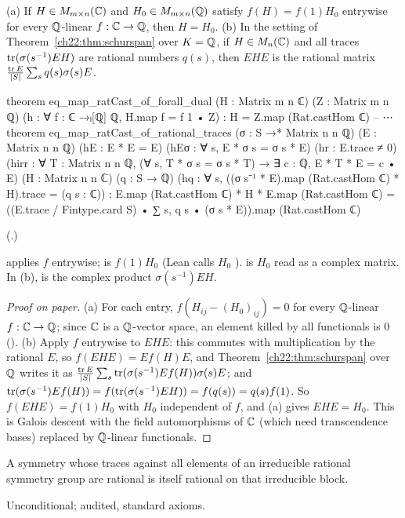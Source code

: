\begin{theorem}\label{ch22:thm:descent}
(a) If $H\in M_{m\times n}({\mathbb{C}})$ and $H_0\in M_{m\times n}({\mathbb{Q}})$ satisfy $f(H)=f(1)H_0$ entrywise for every ${\mathbb{Q}}$-linear
$f:{\mathbb{C}}\to{\mathbb{Q}}$, then $H=H_0$.
(b) In the setting of Theorem~\ref{ch22:thm:schurspan} over $K={\mathbb{Q}}$, if $H\in M_n({\mathbb{C}})$ and all traces
$\operatorname{tr}(\sigma(s^{-1})EH)$ are rational numbers $q(s)$, then $EHE$ is the rational matrix
$\frac{\operatorname{tr} E}{|S|}\sum_sq(s)\sigma(s)E$.
\end{theorem}
\begin{leancode}
theorem eq_map_ratCast_of_forall_dual (H : Matrix m n ℂ) (Z : Matrix m n ℚ)
    (h : ∀ f : ℂ →ₗ[ℚ] ℚ, H.map f = f 1 • Z) : H = Z.map (Rat.castHom ℂ)
-- ⋯
theorem eq_map_ratCast_of_rational_traces (σ : S →* Matrix n n ℚ) (E : Matrix n n ℚ)
    (hE : E * E = E) (hEσ : ∀ s, E * σ s = σ s * E) (hr : E.trace ≠ 0)
    (hirr : ∀ T : Matrix n n ℚ, (∀ s, T * σ s = σ s * T) → ∃ c : ℚ, E * T * E = c • E)
    (H : Matrix n n ℂ) (q : S → ℚ)
    (hq : ∀ s, ((σ s⁻¹ * E).map (Rat.castHom ℂ) * H).trace = (q s : ℂ)) :
    E.map (Rat.castHom ℂ) * H * E.map (Rat.castHom ℂ)
      = ((E.trace / Fintype.card S) • ∑ s, q s • (σ s * E)).map (Rat.castHom ℂ)
\end{leancode}
(.)
\begin{dictionary}
 applies $f$ entrywise;  is $f(1)H_0$ (Lean calls $H_0$ ).   is $H_0$ read as a complex
matrix.  In (b),  is the complex product $\sigma(s^{-1})EH$.
\end{dictionary}
\begin{proof}[Proof on paper]
(a) For each entry, $f(H_{ij}-(H_0)_{ij})=0$ for every ${\mathbb{Q}}$-linear $f:{\mathbb{C}}\to{\mathbb{Q}}$; since ${\mathbb{C}}$ is a ${\mathbb{Q}}$-vector space, an element
killed by all functionals is $0$ ().  (b) Apply $f$ entrywise to $EHE$: this
commutes with multiplication by the rational $E$, so $f(EHE)=Ef(H)E$, and Theorem~\ref{ch22:thm:schurspan} over ${\mathbb{Q}}$
writes it as $\frac{\operatorname{tr} E}{|S|}\sum_s\operatorname{tr}(\sigma(s^{-1})Ef(H))\sigma(s)E$; and $\operatorname{tr}(\sigma(s^{-1})Ef(H))=f(\operatorname{tr}(\sigma(s^{-1})EH))=
f(q(s))=q(s)f(1)$.  So $f(EHE)=f(1)H_0$ with $H_0$ independent of $f$, and (a) gives $EHE=H_0$.  This is Galois descent with the
field automorphisms of ${\mathbb{C}}$ (which need transcendence bases) replaced by ${\mathbb{Q}}$-linear functionals.
\end{proof}
\begin{physics}A symmetry whose traces against all elements of an irreducible rational symmetry group are rational is
itself rational on that irreducible block.\end{physics}
\begin{status}Unconditional; audited, standard axioms.\end{status}


